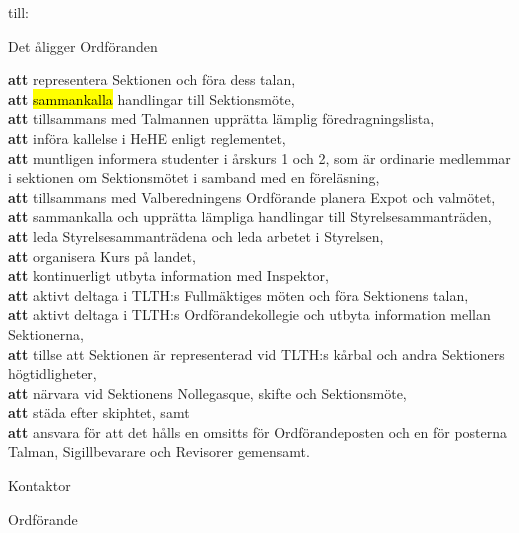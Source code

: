 \documentclass[../_main/handlingar.tex]{subfiles}
\begin{document}
\begin{attsatser}
    till:\par
    \begin{itshape}
    Det åligger Ordföranden\par
    \textbf{att} representera Sektionen och föra dess talan,\\
    \textbf{att} \hl{sammankalla} handlingar till Sektionsmöte,\\
    \textbf{att} tillsammans med Talmannen upprätta lämplig föredragningslista,\\
    \textbf{att} införa kallelse i HeHE enligt reglementet,\\
    \textbf{att} muntligen informera studenter i årskurs 1 och 2, som är ordinarie medlemmar i sektionen om Sektionsmötet i samband med en föreläsning,\\
    \textbf{att} tillsammans med Valberedningens Ordförande planera Expot och valmötet,\\
    \textbf{att} sammankalla och upprätta lämpliga handlingar till Styrelsesammanträden,\\
    \textbf{att} leda Styrelsesammanträdena och leda arbetet i Styrelsen,\\
    \textbf{att} organisera Kurs på landet,\\
    \textbf{att} kontinuerligt utbyta information med Inspektor,\\
    \textbf{att} aktivt deltaga i TLTH:s Fullmäktiges möten och föra Sektionens talan,\\
    \textbf{att} aktivt deltaga i TLTH:s Ordförandekollegie och utbyta information mellan Sektionerna,\\
    \textbf{att} tillse att Sektionen är representerad vid TLTH:s kårbal och andra Sektioners högtidligheter,\\
    \textbf{att} närvara vid Sektionens Nollegasque, skifte och Sektionsmöte,\\
    \textbf{att} städa efter skiphtet, samt\\
    \textbf{att} ansvara för att det hålls en omsitts för Ordförandeposten och en för posterna Talman, Sigillbevarare och Revisorer gemensamt.
    \end{itshape}
\end{attsatser}

\begin{signatures}{2}
    \ist
    \signature{Erik Månsson}{Kontaktor}
    \signature{Fredrik Peterson}{Ordförande}
\end{signatures}
\end{document}
